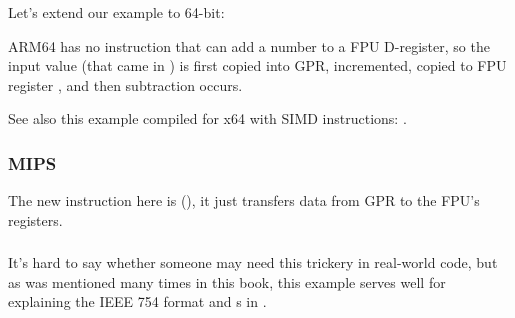 Let's extend our example to 64-bit:



ARM64 has no instruction that can add a number to a FPU D-register, 
so the input value (that came in ) is first copied into \ac{GPR},
incremented, copied to FPU register , and then subtraction occurs.



See also this example compiled for x64 with SIMD instructions: .

\subsubsection{MIPS}


The new instruction here is  (), it just transfers data from \ac{GPR} to the FPU's registers.



\subsubsection{\Conclusion}

It's hard to say whether someone may need this trickery in real-world code, 
but as was mentioned many times in this book, this example serves well 
for explaining the IEEE 754 format and s in \CCpp.

